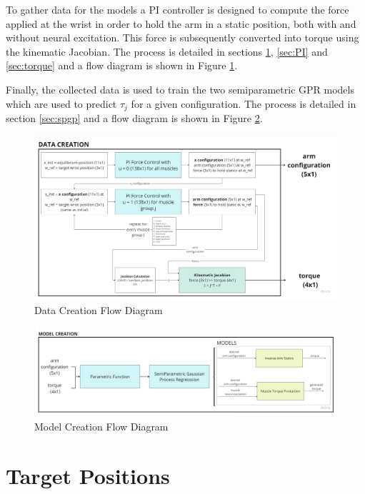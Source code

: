 To gather data for the models a PI controller is designed to compute the force applied at the wrist in order to hold the arm in a static position, both with and without neural excitation. This force is subsequently converted into torque using the kinematic Jacobian. The process is detailed in sections \ref{sec:tp}, \ref{sec:PI} and \ref{sec:torque} and a flow diagram is shown in Figure \ref{fig:datacreation}. 

Finally, the collected data is used to train the two semiparametric GPR models which are used to predict $\tau_j$ for a given configuration. The process is detailed in section \ref{sec:spgp} and a flow diagram is shown in Figure \ref{fig:modelcreation}.

\begin{figure}[h!]
    \centering
    \includegraphics[width=1\textwidth]{Pictures/Model/DataCreation.jpg}
    \caption{Data Creation Flow Diagram}
    \label{fig:datacreation}
\end{figure}




\begin{figure}[h!]
    \centering
    \includegraphics[width=1\textwidth]{Pictures/Model/ModelCreation.jpg}
    \caption{Model Creation Flow Diagram}
    \label{fig:modelcreation}
\end{figure}

\newpage
 \section{Target Positions} \label{sec:tp}

